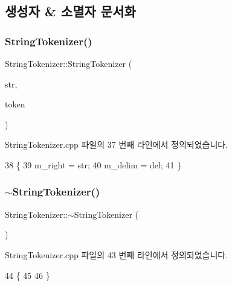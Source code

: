 \subsection{생성자 \& 소멸자 문서화}
\mbox{\label{class_string_tokenizer_aad9d79efdc0b06f3ac696ed650d2f392}} 
\subsubsection{\texorpdfstring{String\+Tokenizer()}{StringTokenizer()}}
{\footnotesize\ttfamily String\+Tokenizer\+::\+String\+Tokenizer (\begin{DoxyParamCaption}\item[{C\+String}]{str,  }\item[{C\+String}]{token }\end{DoxyParamCaption})}



String\+Tokenizer.\+cpp 파일의 37 번째 라인에서 정의되었습니다.


\begin{DoxyCode}
38 \{
39   m\_right = str;
40   m\_delim = del;
41 \}
\end{DoxyCode}
\mbox{\label{class_string_tokenizer_a26a59cd69f871ace17ec831e1508b377}} 
\subsubsection{\texorpdfstring{$\sim$\+String\+Tokenizer()}{~StringTokenizer()}}
{\footnotesize\ttfamily String\+Tokenizer\+::$\sim$\+String\+Tokenizer (\begin{DoxyParamCaption}{ }\end{DoxyParamCaption})\hspace{0.3cm}{\ttfamily [virtual]}}



String\+Tokenizer.\+cpp 파일의 43 번째 라인에서 정의되었습니다.


\begin{DoxyCode}
44 \{
45 
46 \}
\end{DoxyCode}


